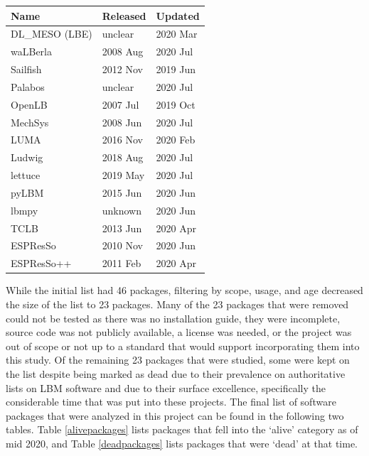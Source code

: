 \documentclass[12pt, notitlepage]{article}
\begin{document}
\begin{center}
	\begin{tabular}{ p{4cm}p{3cm}p{3cm} }
		\hline
		Name & Released & Updated\\
		\hline
		DL\_MESO (LBE) & unclear & 2020 Mar\\
		waLBerla & 2008 Aug & 2020 Jul\\
		Sailfish & 2012 Nov & 2019 Jun\\
		Palabos & unclear & 2020 Jul\\
		OpenLB & 2007 Jul & 2019 Oct\\
		MechSys   & 2008 Jun    & 2020 Jul\\
		LUMA&   2016 Nov   & 2020 Feb\\
		Ludwig& 2018 Aug & 2020 Jul\\
		lettuce    & 2019 May & 2020 Jul\\
		pyLBM & 2015 Jun&   2020 Jun\\
		lbmpy& unknown  & 2020 Jun  \\
		TCLB & 2013 Jun  & 2020 Apr\\
		ESPResSo & 2010 Nov & 2020 Jun\\
		ESPResSo++ & 2011 Feb & 2020 Apr\\
		\hline
	\end{tabular}
	\label{alivepackages}
\end{center}

While the initial list had 46 packages, filtering by scope, usage, and age decreased the size of the list to 23 packages. Many of the 23 packages that were removed could not be tested as there was no installation guide, they were incomplete, source code was not publicly available, a license was needed, or the project was out of scope or not up to a standard that would support incorporating them into this study. Of the remaining 23 packages that were studied, some were kept on the list despite being marked as dead due to their prevalence on authoritative lists on LBM software and due to their surface excellence, specifically the considerable time that was put into these projects.  
The final list of software packages that were analyzed in this project can be found in the following two tables. Table \ref{alivepackages} lists packages that fell into the `alive' category as of mid 2020, and Table \ref{deadpackages} lists packages that were `dead' at that time. \\
\end{document}
